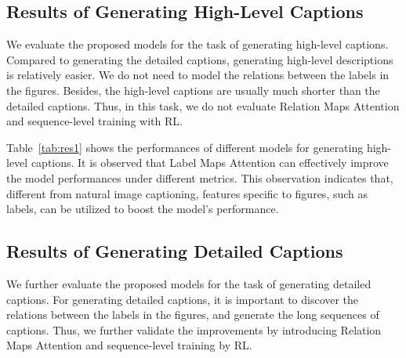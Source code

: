 \documentclass[11pt,a4paper]{article}
\begin{document}





\subsection{Results of Generating High-Level Captions}
We evaluate the proposed models for the task of generating high-level captions. 
Compared to generating the detailed captions, generating high-level descriptions is relatively easier. 
We do not need to model the relations between the labels in the figures. Besides, the high-level captions are usually much shorter than the detailed captions. Thus, in this task, we do not evaluate Relation Maps Attention and sequence-level training with RL.

Table~\ref{tab:res1} shows the performances of different models for generating high-level captions. 
It is observed that Label Maps Attention can effectively improve the model performances under different metrics. This observation indicates that, different from natural image captioning, features specific to figures, such as labels, can be utilized to boost the model's performance. 


\subsection{Results of Generating Detailed Captions}
We further evaluate the proposed models for the task of generating detailed captions. 
For generating detailed captions, it is important to discover the relations between the labels in the figures, and generate the long sequences of captions. Thus, we further validate the improvements by introducing Relation Maps Attention and sequence-level training by RL.
\end{document}
